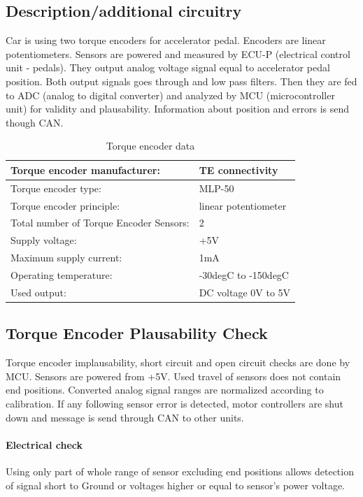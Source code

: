 \subsection{Description/additional circuitry}
Car is using two torque encoders for accelerator pedal. Encoders are linear potentiometers. Sensors are powered and measured by ECU-P (electrical control unit - pedals). They output analog voltage signal equal to accelerator pedal position. Both output signals goes through \label{fig:ecup_analog_input} and low pass filters. Then they are fed to ADC (analog to digital converter) and analyzed by MCU (microcontroller unit) for validity and plausability. Information about position and errors is send though CAN.

\begin{table}[H]
	\centering
	\caption{Torque encoder data}
	\begin{tabularx}{\textwidth}{|X|X|}
		\hline
		Torque encoder manufacturer: & TE connectivity  \\[\TableSize]\hline
		Torque encoder type: & MLP-50  \\[\TableSize]\hline
		Torque encoder principle: & linear potentiometer  \\[\TableSize]\hline
		Total number of Torque Encoder Sensors: & 2  \\[\TableSize]\hline
		Supply voltage: & +5V  \\[\TableSize]\hline
		Maximum supply current: & 1mA  \\[\TableSize]\hline
		Operating temperature: & -30degC to -150degC  \\[\TableSize]\hline
		Used output: & DC voltage 0V to 5V\\[\TableSize]\hline
	\end{tabularx}%
	\label{tab:encoder-general}%
\end{table}%

\subsection{Torque Encoder Plausability Check}
Torque encoder implausability, short circuit and open circuit checks are done by MCU. Sensors are powered from +5V. Used travel of sensors does not contain end positions. Converted analog signal ranges are normalized according to calibration.
If any following sensor error is detected, motor controllers are shut down and message is send through CAN to other units.

\paragraph{Electrical check} 
Using only part of whole range of sensor excluding end positions allows detection of signal short to Ground or voltages higher or equal to sensor's power voltage.

